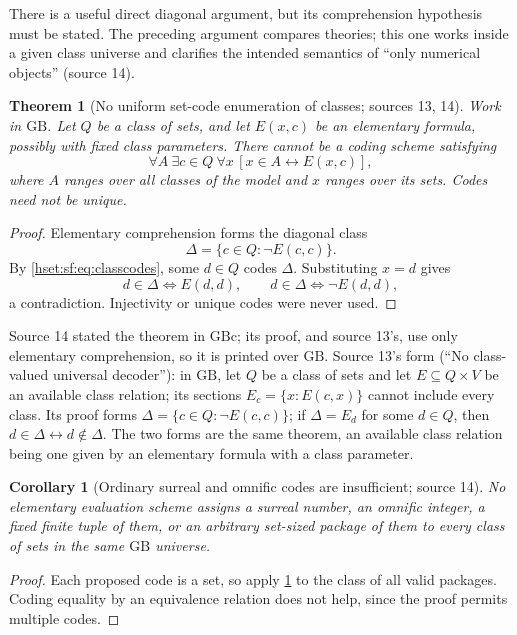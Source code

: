 \documentclass[11pt,letterpaper]{article}
\newtheorem{theorem}{Theorem}[section]
\newtheorem{corollary}[corollary]{Corollary}\aliascntresetthe{corollary}
\theoremstyle{definition}
\theoremstyle{remark}
\newcommand{\GB}{\mathrm{GB}}
\newcommand{\GBc}{\mathrm{GBc}}
\begin{document}
There is a useful direct diagonal argument, but its comprehension hypothesis must
be stated. The preceding argument compares theories; this one works inside a given
class universe and clarifies the intended semantics of ``only numerical objects''
(source 14).

\begin{theorem}[No uniform set-code enumeration of classes; sources 13, 14]\label{hset:sf:thm:diagonal}
Work in $\GB$. Let $Q$ be a class of sets, and let $E(x,c)$ be an elementary
formula, possibly with fixed class parameters. There cannot be a coding scheme
satisfying
\begin{equation}\label{hset:sf:eq:classcodes}
 \forall A\ \exists c\in Q\ \forall x\,[x\in A\leftrightarrow E(x,c)],
\end{equation}
where $A$ ranges over all classes of the model and $x$ ranges over its sets. Codes
need not be unique.
\end{theorem}
\begin{proof}
Elementary comprehension forms the diagonal class
\[
 \Delta=\{c\in Q:\neg E(c,c)\}.
\]
By \eqref{hset:sf:eq:classcodes}, some $d\in Q$ codes $\Delta$. Substituting $x=d$
gives
\[
 d\in \Delta\iff E(d,d),\qquad d\in \Delta\iff\neg E(d,d),
\]
a contradiction. Injectivity or unique codes were never used.
\end{proof}

Source 14 stated the theorem in $\GBc$; its proof, and source 13's, use only
elementary comprehension, so it is printed over $\GB$. Source 13's form
(``No class-valued universal decoder''): in $\GB$, let $Q$ be a class of sets and
let $E\subseteq Q\times V$ be an available class relation; its sections
$E_c=\{x:E(c,x)\}$ cannot include every class. Its proof forms
$\Delta=\{c\in Q:\neg E(c,c)\}$; if $\Delta=E_d$ for some $d\in Q$, then
$d\in\Delta\leftrightarrow d\notin\Delta$. The two forms are the same theorem, an
available class relation being one given by an elementary formula with a class
parameter.

\begin{corollary}[Ordinary surreal and omnific codes are insufficient; source 14]
\label{hset:sf:cor:diagonal}
No elementary evaluation scheme assigns a surreal number, an omnific integer, a
fixed finite tuple of them, or an arbitrary set-sized package of them to
\emph{every class of sets} in the same $\GB$ universe.
\end{corollary}
\begin{proof}
Each proposed code is a set, so apply \cref{hset:sf:thm:diagonal} to the class of
all valid packages. Coding equality by an equivalence relation does not help, since
the proof permits multiple codes.
\end{proof}
\end{document}
